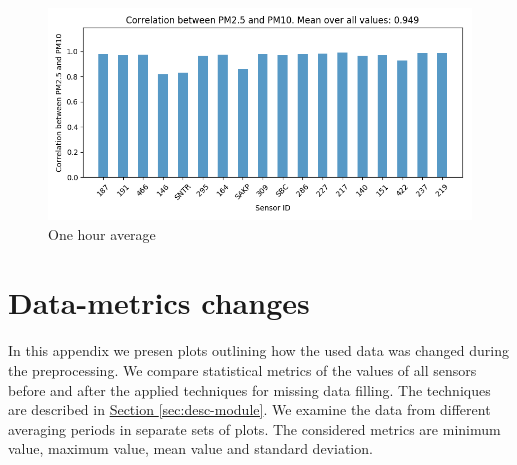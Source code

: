 \documentclass[12pt,a4paper,twoside]{scrartcl}
\numberwithin{equation}{section}
\newcommand{\refsec}[1]{\hyperref[#1]{Section \ref*{#1}}}
\newcounter{mypagecount}%
\newenvironment{interlude}{%
  \clearpage
  \setcounter{mypagecount}{\value{page}}%
  \thispagestyle{empty}%
  \pagestyle{empty}%
  }{%
  \clearpage
  \setcounter{page}{\value{mypagecount}}%
  }
\let\chapter=\section %
\begin{document}
\begin{interlude}
\begin{appendices}
\begin{center}
      \begin{figure}[H]
        \centerline{\includegraphics[width=1\textwidth]{figures/1H_P1_P2_correlation}}
        \caption[PM2.5-PM10 correlation (one hour average)]{One hour average}
      \end{figure}
      
    \end{center}
    \chapter{Data-metrics changes}\label{app:b}
    In this appendix we presen plots outlining how the used data was changed during the preprocessing. We compare statistical metrics of the values of all sensors before and after the applied techniques for missing data filling. The techniques are described in \refsec{sec:desc-module}. We examine the data from different averaging periods in separate sets of plots. The considered metrics are minimum value, maximum value, mean value and standard deviation.
    \begin{center}


\end{center}
\end{appendices}
\end{interlude}
\end{document}
